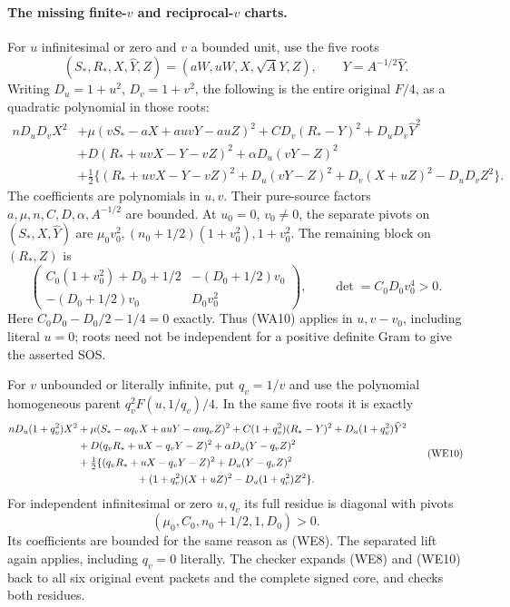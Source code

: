 \paragraph{The missing finite-$v$ and reciprocal-$v$ charts.}
For $u$ infinitesimal or zero and $v$ a bounded unit, use the five
roots
\[
 (S_*,R_*,X,\widehat Y,Z)=(aW,uW,X,\sqrt A Y,Z),\qquad
 Y=A^{-1/2}\widehat Y.
\]
Writing $D_u=1+u^2$, $D_v=1+v^2$, the following is the entire
original $F/4$, as a quadratic polynomial in those roots:
\[
\begin{split}
 nD_uD_vX^2&+\mu(vS_*-aX+auvY-auZ)^2
 +CD_v(R_*-Y)^2+D_uD_v\widehat Y^2\\
 &+D(R_*+uvX-Y-vZ)^2+\alpha D_u(vY-Z)^2\\
 &+\tfrac12\{(R_*+uvX-Y-vZ)^2+D_u(vY-Z)^2
               +D_v(X+uZ)^2-D_uD_vZ^2\}.             \end{split}\tag{WE8}
\]
The coefficients are polynomials in $u,v$. Their pure-source factors $a,\mu,n,C,D,\alpha,A^{-1/2}$ are bounded.
At $u_0=0$, $v_0\ne0$, the separate pivots on
$(S_*,X,\widehat Y)$ are
$\mu_0v_0^2,(n_0+1/2)(1+v_0^2),1+v_0^2$.
The remaining block on $(R_*,Z)$ is
\[
 \begin{pmatrix}
 C_0(1+v_0^2)+D_0+1/2&-(D_0+1/2)v_0\\
 -(D_0+1/2)v_0&D_0v_0^2
 \end{pmatrix},\qquad \det=C_0D_0v_0^4>0.           \tag{WE9}
\]
Here $C_0D_0-D_0/2-1/4=0$ exactly. Thus (WA10) applies
in $u,v-v_0$, including literal $u=0$; roots need not be
independent for a positive definite Gram to give the asserted SOS.

For $v$ unbounded or literally infinite, put $q_v=1/v$ and
use the polynomial homogeneous parent $q_v^2F(u,1/q_v)/4$.
In the same five roots it is exactly
\[
\begin{split}
 nD_u(1+q_v^2)X^2
 &+\mu(S_*-aq_vX+auY-auq_vZ)^2
 +C(1+q_v^2)(R_*-Y)^2+D_u(1+q_v^2)\widehat Y^2\\
 &+D(q_vR_*+uX-q_vY-Z)^2+\alpha D_u(Y-q_vZ)^2\\
 &+\tfrac12\{(q_vR_*+uX-q_vY-Z)^2+D_u(Y-q_vZ)^2\\
 &\hspace{20mm}+(1+q_v^2)(X+uZ)^2-D_u(1+q_v^2)Z^2\}.
                                                               \end{split}\tag{WE10}
\]
For independent infinitesimal or zero $u,q_v$ its full residue
is diagonal with pivots
\[
 (\mu_0,C_0,n_0+1/2,1,D_0)>0.                       \tag{WE11}
\]
Its coefficients are bounded for the same reason as (WE8).
The separated lift again applies, including $q_v=0$ literally.
The checker expands (WE8) and (WE10) back to all six original
event packets and the complete signed core, and checks both residues.

